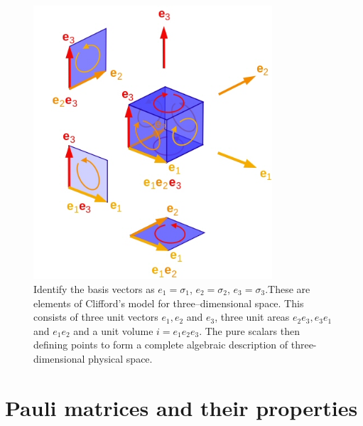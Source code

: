 \documentclass[handout,10pt]{beamer}
\newcommand{\iGA}{{i}}
\begin{document}
\begin{frame}[shrink=25]{}

\begin{figure}[htb]
\begin{center}
\includegraphics[width=3.5in]{GeometrySpace}
\end{center}
\caption{Identify the basis vectors as $e_1 = \sigma_1$, $e_2 = \sigma_2$, $e_3 = \sigma_3$.These are elements of Clifford's model for three--dimensional space. This consists of three unit vectors $ e_1, e_2 $ and $ e_3 $, three unit areas $ e_2 e_3, e_3 e_1 $ and $ e_1 e_2 $ and a unit volume $ \iGA = e_1 e_2 e_3 $. The pure scalars then defining points to form a complete algebraic description of three-dimensional physical space. \label{ThreeSpace}}
\end{figure}
\end{frame}
 \section{Pauli matrices and their properties}
 
\end{document}
